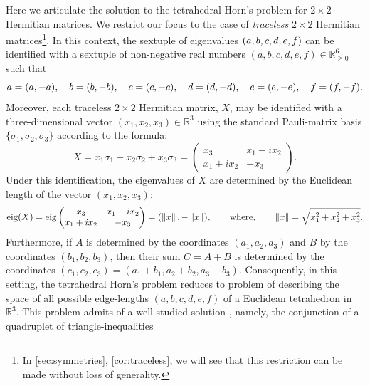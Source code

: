 \documentclass[notitlepage, 10pt]{article}
\begin{document}
\begin{exam}[Tetrahedral Horn's problem for \texorpdfstring{$d=2$}{d=2}]
    \label{exam:d_2}
    Here we articulate the solution to the tetrahedral Horn's problem for $2\times 2$ Hermitian matrices.
    We restrict our focus to the case of \textit{traceless} $2 \times 2$ Hermitian matrices\footnote{In \cref{sec:symmetries}, \cref{cor:traceless}, we will see that this restriction can be made without loss of generality.}.
    In this context, the sextuple of eigenvalues $(a,b,c,d,e,f)$ can be identified with a sextuple of non-negative real numbers $(a,b,c,d,e,f) \in \mathbb R_{\geq 0}^{6}$ such that
    \begin{equation}
        \label{eq:traceless_two_dim_tetra}
        a = (a, -a), \quad
        b = (b, -b), \quad
        c = (c, -c), \quad
        d = (d, -d), \quad
        e = (e, -e), \quad
        f = (f, -f).
    \end{equation}
    Moreover, each traceless $2 \times 2$ Hermitian matrix, $X$, may be identified with a three-dimensional vector $(x_1, x_2, x_3) \in \mathbb R^{3}$ using the standard Pauli-matrix basis $\{\sigma_1, \sigma_2, \sigma_3\}$ according to the formula:
    \begin{equation}
        X = x_1 \sigma_1 + x_2 \sigma_2 + x_3 \sigma_3 = \begin{pmatrix} x_3 & x_1-ix_2 \\ x_1+ix_2 & -x_3 \end{pmatrix}.
    \end{equation}
    Under this identification, the eigenvalues of $X$ are determined by the Euclidean length of the vector $(x_1, x_2, x_3)$:
    \begin{equation}
        \operatorname{eig}(X) = \operatorname{eig}\begin{pmatrix} x_3 & x_1-ix_2 \\ x_1+ix_2 & -x_3 \end{pmatrix} = (\left\lVert x\right\rVert, -\left\lVert x\right\rVert), \qquad \text{where}, \qquad \left\lVert x\right\rVert = \sqrt{x_1^2 + x_2^2 + x_3^2}.
    \end{equation}
    Furthermore, if $A$ is determined by the coordinates $(a_1,a_2,a_3)$ and $B$ by the coordinates $(b_1,b_2,b_3)$, then their sum $C=A+B$ is determined by the coordinates $(c_1, c_2, c_3) = (a_1 + b_1, a_2 + b_2, a_3 + b_3)$.
    Consequently, in this setting, the tetrahedral Horn's problem reduces to problem of describing the space of all possible edge-lengths $(a,b,c,d,e,f)$ of a Euclidean tetrahedron in $\mathbb R^{3}$.
    This problem admits of a well-studied solution \cite{richardson1902trigonometry,wirth2009edge}, namely, the conjunction of a quadruplet of triangle-inequalities


\end{exam}
\end{document}
